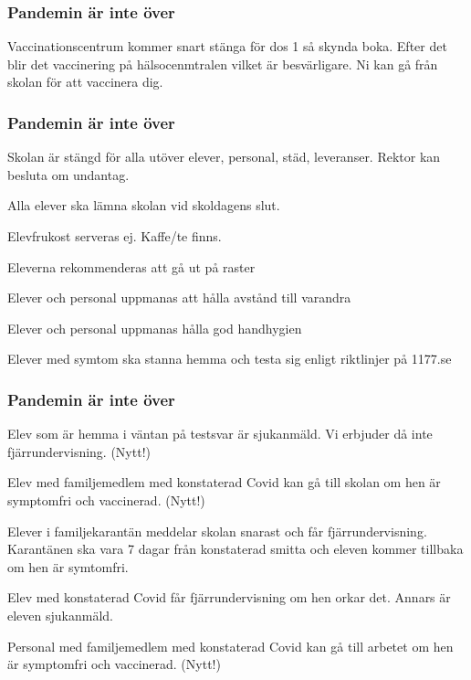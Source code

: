 \documentclass[11pt]{beamer}
\begin{document}
    \begin{frame}
        \frametitle{Pandemin är inte över}
        Vaccinationscentrum kommer snart stänga för dos 1 så skynda boka. Efter det blir det vaccinering på hälsocenmtralen vilket är besvärligare. Ni kan gå från skolan för att vaccinera dig.
    \end{frame}
    \begin{frame}
        \frametitle{Pandemin är inte över}
        \begin{enumeration}
            \item Skolan är stängd för alla utöver elever, personal, städ, leveranser. Rektor kan besluta om undantag.

            \item Alla elever ska lämna skolan vid skoldagens slut.

            \item Elevfrukost serveras ej. Kaffe/te finns.

            \item Eleverna rekommenderas att gå ut på raster

            \item Elever och personal uppmanas att hålla avstånd till varandra

            \item Elever och personal uppmanas hålla god handhygien

            \item Elever med symtom ska stanna hemma och testa sig enligt riktlinjer på 1177.se
        \end{enumeration}
    \end{frame}
    \begin{frame}
    \frametitle{Pandemin är inte över}
        \begin{enumeration}
            \item Elev som är hemma i väntan på testsvar är sjukanmäld. Vi erbjuder då inte fjärrundervisning. (Nytt!)

            \item Elev med familjemedlem med konstaterad Covid kan gå till skolan om hen är symptomfri och vaccinerad. (Nytt!)

            \item Elever i familjekarantän meddelar skolan snarast och får fjärrundervisning. Karantänen ska vara 7 dagar från konstaterad smitta och eleven kommer tillbaka om hen är symtomfri.

            \item Elev med konstaterad Covid får fjärrundervisning om hen orkar det. Annars är eleven sjukanmäld.

            \item Personal med familjemedlem med konstaterad Covid kan gå till arbetet om hen är symptomfri och vaccinerad. (Nytt!)
        \end{enumeration}
    \end{frame}
\end{document}
